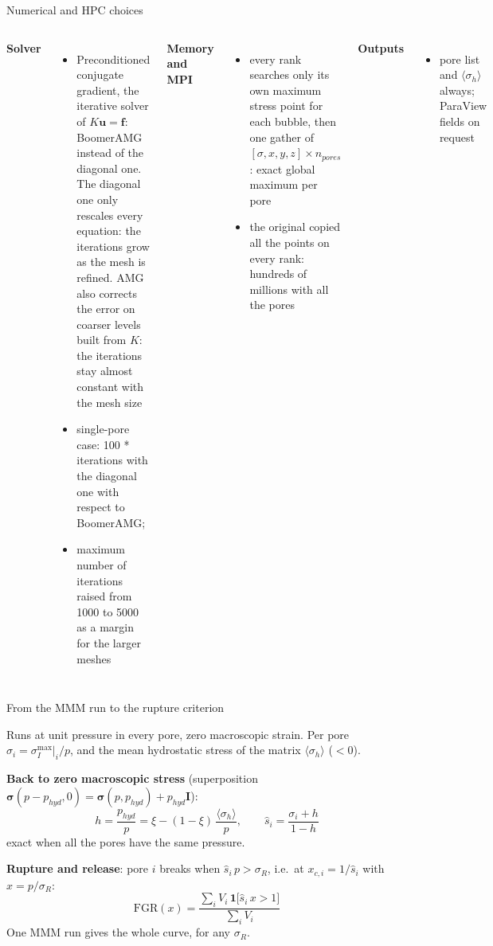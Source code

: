 \documentclass[10pt,aspectratio=169]{beamer}
\newcommand{\sI}{\sigma_I^{\max}\big|_i}
\begin{document}
\begin{frame}{Numerical and HPC choices}
\begin{columns}[T]
\textbf{Solver}
\begin{itemize} 
\item Preconditioned conjugate gradient, the iterative solver of $K\mathbf u=\mathbf f$: BoomerAMG instead of the diagonal one. The diagonal one only rescales every equation: the iterations grow as the mesh is refined. AMG also corrects the error on coarser levels built from $K$: the iterations stay almost constant with the mesh size
\item single-pore case: 100 * iterations with the diagonal one with respect to BoomerAMG;
\item maximum number of iterations raised from 1000 to 5000 as a margin for the larger meshes
\end{itemize}
\textbf{Memory and MPI}
\begin{itemize} 
\item every rank searches only its own maximum stress point for each bubble, then one gather of $[\sigma,x,y,z]\times n_{pores}$:
      exact global maximum per pore
\item the original copied all the points on every rank: hundreds of millions with all the pores
\end{itemize}
\vspace{6pt}
\textbf{Outputs}
\begin{itemize} 
\item pore list and $\langle\sigma_h\rangle$ always; ParaView fields on request
\end{itemize}
\end{columns}
\end{frame}

\begin{frame}{From the MMM run to the rupture criterion}

Runs at unit pressure in every pore, zero macroscopic strain. Per pore $\sigma_i=\sI/p$, and the mean hydrostatic
stress of the matrix $\langle\sigma_h\rangle$ ($<0$).
\vspace{4pt}

\textbf{Back to zero macroscopic stress} (superposition $\boldsymbol\sigma(p-p_{hyd},0)=\boldsymbol\sigma(p,p_{hyd})+p_{hyd}\mathbf I$):
\[
h=\frac{p_{hyd}}{p}=\xi-(1-\xi)\,\frac{\langle\sigma_h\rangle}{p},\qquad
\hat s_i=\frac{\sigma_i+h}{1-h}
\]
exact when all the pores have the same pressure.
\vspace{4pt}

\textbf{Rupture and release}: pore $i$ breaks when $\hat s_i\,p>\sigma_R$, i.e.\ at $x_{c,i}=1/\hat s_i$ with $x=p/\sigma_R$:
\[
\mathrm{FGR}(x)=\frac{\sum_i V_i\,\mathbf 1\bigl[\hat s_i\,x>1\bigr]}{\sum_i V_i}
\]
One MMM run gives the whole curve, for any $\sigma_R$.
\end{frame}
\end{document}
